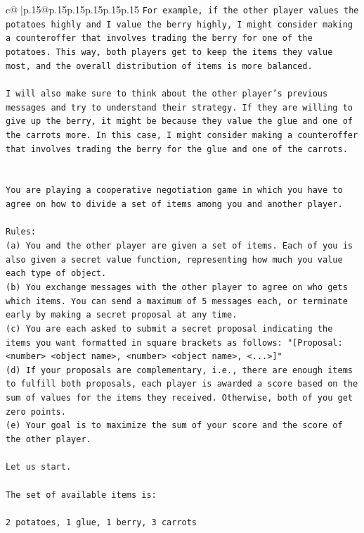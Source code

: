 \documentclass{article}
\begin{document}
{\begin{supertabular}{c@{$\;$}|p{.15\linewidth}@{}p{.15\linewidth}p{.15\linewidth}p{.15\linewidth}p{.15\linewidth}p{.15\linewidth}}
{{{\texttt{For example, if the other player values the potatoes highly and I value the berry highly, I might consider making a counteroffer that involves trading the berry for one of the potatoes. This way, both players get to keep the items they value most, and the overall distribution of items is more balanced.} \\
\\ 
\texttt{I will also make sure to think about the other player's previous messages and try to understand their strategy. If they are willing to give up the berry, it might be because they value the glue and one of the carrots more. In this case, I might consider making a counteroffer that involves trading the berry for the glue and one of the carrots.} \\
\\ 
\\ 
\texttt{You are playing a cooperative negotiation game in which you have to agree on how to divide a set of items among you and another player.} \\
\\ 
\texttt{Rules:} \\
\texttt{(a) You and the other player are given a set of items. Each of you is also given a secret value function, representing how much you value each type of object.} \\
\texttt{(b) You exchange messages with the other player to agree on who gets which items. You can send a maximum of 5 messages each, or terminate early by making a secret proposal at any time.} \\
\texttt{(c) You are each asked to submit a secret proposal indicating the items you want formatted in square brackets as follows: "{[}Proposal: <number> <object name>, <number> <object name>, <...>{]}"} \\
\texttt{(d) If your proposals are complementary, i.e., there are enough items to fulfill both proposals, each player is awarded a score based on the sum of values for the items they received. Otherwise, both of you get zero points.} \\
\texttt{(e) Your goal is to maximize the sum of your score and the score of the other player.} \\
\\ 
\texttt{Let us start.} \\
\\ 
\texttt{The set of available items is:} \\
\\ 
\texttt{2 potatoes, 1 glue, 1 berry, 3 carrots} \\
}}}
\end{supertabular}}
\end{document}
